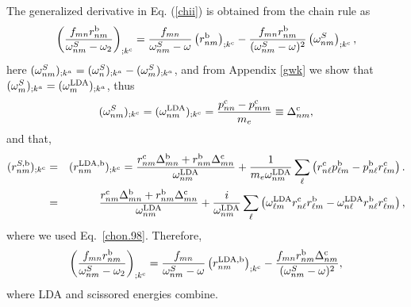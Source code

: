 \documentclass[floatfix,prb,aps,superscriptaddress,11pt,preprint]{revtex4}
\begin{document}
The generalized derivative
in Eq. (\ref{chii}) is obtained from the chain rule as
\begin{equation}\label{gene}
\left(\frac{f_{mn}r_{nm}^{\mathrm{b}}}{\omega^S_{nm}-\omega_2}\right)_{;k^{\mathrm{c}}}=
\frac{f_{mn}}{\omega^S_{nm}-\omega}\left(r_{nm}^{\mathrm{b}}\right)_{;k^{\mathrm{c}}}
-\frac{f_{mn}r_{nm}^{\mathrm{b}}}{(\omega^S_{nm}-\omega)^2}\left(\omega^S_{nm}\right)_{;k^{\mathrm{c}}},
\end{equation} 
here $(\omega^S_{nm})_{;k^a}=(\omega^S_{n})_{;k^a}-(\omega^S_{m})_{;k^a}$, and 
from Appendix \ref{gwk} we show that 
$(\omega^S_{m})_{;k^a}=(\omega^{\mathrm{LDA}}_{m})_{;k^a}$, thus  
\begin{equation}\label{wk}
(\omega^S_{nm})_{;k^{\mathrm{c}}}=(\omega^{\mathrm{LDA}}_{nm})_{;k^{\mathrm{c}}}=
\frac{p_{nn}^{\mathrm{c}}-p_{mm}^{\mathrm{c}}}{m_e}\equiv\Delta_{nm}^{\mathrm{c}}
,
\end{equation}
and that,\cite{nastosPRB05}
\begin{eqnarray}\label{rgk}
(r^{S,\mathrm{b}}_{nm})_{;k^{\mathrm{c}}}
&=&
(r^{\mathrm{LDA},\mathrm{b}}_{nm})_{;k^{\mathrm{c}}}=
\frac{r_{nm}^{\mathrm{c}}\Delta_{mn}^{\mathrm{b}}+r_{nm}^{\mathrm{b}}\Delta_{mn}^{\mathrm{c}}}{\omega^{\mathrm{LDA}}_{nm}}
+\frac{1}{m_e\omega^{\mathrm{LDA}}_{nm}}\sum_\ell\left(r_{n\ell}^{\mathrm{c}}p_{\ell m}^{\mathrm{b}}
-p_{n\ell}^{\mathrm{b}}r_{\ell m}^{\mathrm{c}}\right).
\nonumber\\
&=&
\frac{r_{nm}^{\mathrm{c}}\Delta_{mn}^{\mathrm{b}}+r_{nm}^{\mathrm{b}}\Delta_{mn}^{\mathrm{c}}}{\omega^{\mathrm{LDA}}_{nm}}
+\frac{i}{\omega^{\mathrm{LDA}}_{nm}}\sum_\ell\left(\omega^{\mathrm{LDA}}_{\ell m}r_{n\ell}^{\mathrm{c}}r_{\ell m}^{\mathrm{b}}
-\omega^{\mathrm{LDA}}_{n \ell}r_{n\ell}^{\mathrm{b}}r_{\ell m}^{\mathrm{c}}\right),
\end{eqnarray} 
where we used Eq.~\eqref{chon.98}. Therefore,
\begin{equation}\label{gene2}
\left(\frac{f_{mn}r_{nm}^{\mathrm{b}}}{\omega^S_{nm}-\omega_2}\right)_{;k^{\mathrm{c}}}=
\frac{f_{mn}}{\omega^S_{nm}-\omega}\left(r_{nm}^{\mathrm{LDA},\mathrm{b}}\right)_{;k^{\mathrm{c}}}
-\frac{f_{mn}r_{nm}^{\mathrm{b}}\Delta_{nm}^{\mathrm{c}}}{(\omega^S_{nm}-\omega)^2}
,
\end{equation}
where LDA and scissored energies combine.
\end{document}

